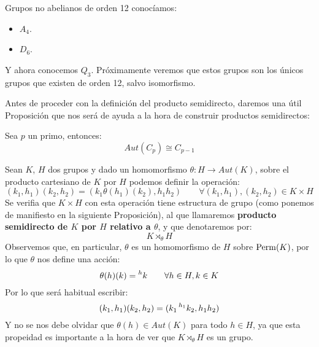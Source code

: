\begin{ejemplo}
    Grupos no abelianos de orden 12 conocíamos:
    \begin{itemize}
        \item $A_4$.
        \item $D_6$.
    \end{itemize}
    Y ahora conocemos $Q_3$. Próximamente veremos que estos grupos son los únicos grupos que existen de orden 12, salvo isomorfismo.
\end{ejemplo}

\noindent
Antes de proceder con la definición del producto semidirecto, daremos una útil Proposición que nos será de ayuda a la hora de construir productos semidirectos:
\begin{prop}\label{prop:aut_ciclico}
    Sea $p$ un primo, entonces:
    \begin{equation*}
        Aut(C_p) \cong C_{p-1}
    \end{equation*} %
\end{prop}

\begin{definicion}
    Sean $K$, $H$ dos grupos y dado un homomorfismo $\theta:H\to Aut(K)$, sobre el producto cartesiano de $K$ por $H$ podemos definir la operación:
    \begin{equation*}
        (k_1,h_1)(k_2,h_2) = (k_1\theta(h_1)(k_2), h_1h_2) \qquad \forall (k_1,h_1),(k_2,h_2) \in K\times H
    \end{equation*}
    Se verifia que $K\times H$ con esta operación tiene estructura de grupo (como ponemos de manifiesto en la siguiente Proposición), al que llamaremos \textbf{producto semidirecto de $K$ por $H$ relativo a $\theta$}, y que denotaremos por:
    \begin{equation*}
        K\rtimes_\theta H
    \end{equation*}
    Observemos que, en particular, $\theta$ es un homomorfismo de $H$ sobre $\operatorname{Perm}(K)$, por lo que $\theta$ nos define una acción:
    \begin{equation*}
        \theta(h)(k) = \prescript{h}{}{k} \qquad \forall h\in H, k\in K
    \end{equation*}
    Por lo que será habitual escribir:
    \begin{equation*}
        (k_1,h_1)(k_2,h_2) = (k_1 \prescript{h_1}{}{k_2}, h_1h_2)
    \end{equation*}
    Y no se nos debe olvidar que $\theta(h) \in Aut(K)$ para todo $h\in H$, ya que esta propeidad es importante a la hora de ver que $K\rtimes_\theta H$ es un grupo.
\end{definicion}

